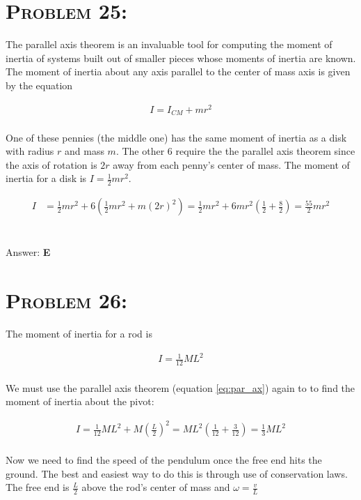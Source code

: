 \documentclass{article}
\begin{document}

\section{\textsc{Problem 25:}} The parallel axis theorem is an invaluable tool for computing the moment of inertia of systems built out of smaller pieces whose moments of inertia are known. The moment of inertia about any axis parallel to the center of mass axis is given by the equation

\begin{gather}
\label{eq:par_ax}I = I_{CM} +m r^{2}
\end{gather}
\\
One of these pennies (the middle one) has the same moment of inertia as a disk with radius $r$ and mass $m$. The other 6 require the the parallel axis theorem since the axis of rotation is $2r$ away from each penny's center of mass. The moment of inertia for a disk is $I = \frac{1}{2} m r^{2}$.

\begin{align}
I &= \frac{1}{2} m r^{2} + 6 \left(  \frac{1}{2}mr^2 + m (2r)^{2}  \right) = \frac{1}{2}mr^{2} + 6m r^{2} \left(  \frac{1}{2}  + \frac{8}{2}  \right)  = \boxed{\frac{55}{2} m r^{2}} \nonumber
\end{align}
\\\\
Answer: \textbf{\textcolor{ProcessBlue}E}\\


\section{\textsc{Problem 26:}} The moment of inertia for a rod is

\begin{gather}
I = \frac{1}{12} M L^{2}
\end{gather}
\\
We must use the parallel axis theorem (equation \ref{eq:par_ax}) again to to find the moment of inertia about the pivot:

\begin{gather}
I = \frac{1}{12} M L^{2} + M \left(   \frac{L}{2}  \right)^{2} = ML^{2} \left(  \frac{1}{12}  + \frac{3}{12}  \right) = \frac{1}{3}M L^{2}\nonumber
\end{gather}
\\
Now we need to find the speed of the pendulum once the free end hits the ground. The best and easiest way to do this is through use of conservation laws. The free end is $\frac{L}{2}$ above the rod's center of mass and $\omega = \frac{v}{L}$
\end{document}
